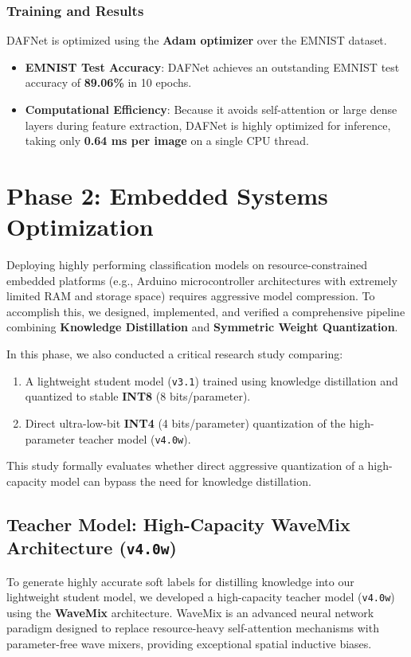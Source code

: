 \documentclass[12pt,a4paper]{article}
\begin{document}
\subsubsection{Training and Results}
DAFNet is optimized using the \textbf{Adam optimizer} over the EMNIST dataset.
\begin{itemize}
    \item \textbf{EMNIST Test Accuracy}: DAFNet achieves an outstanding EMNIST test accuracy of \textbf{89.06\%} in 10 epochs.
    \item \textbf{Computational Efficiency}: Because it avoids self-attention or large dense layers during feature extraction, DAFNet is highly optimized for inference, taking only \textbf{0.64 ms per image} on a single CPU thread.
\end{itemize}

\section{Phase 2: Embedded Systems Optimization}
Deploying highly performing classification models on resource-constrained embedded platforms (e.g., Arduino microcontroller architectures with extremely limited RAM and storage space) requires aggressive model compression. To accomplish this, we designed, implemented, and verified a comprehensive pipeline combining \textbf{Knowledge Distillation} and \textbf{Symmetric Weight Quantization}.

In this phase, we also conducted a critical research study comparing:
\begin{enumerate}
    \item A lightweight student model (\texttt{v3.1}) trained using knowledge distillation and quantized to stable \textbf{INT8} (8 bits/parameter).
    \item Direct ultra-low-bit \textbf{INT4} (4 bits/parameter) quantization of the high-parameter teacher model (\texttt{v4.0w}).
\end{enumerate}

This study formally evaluates whether direct aggressive quantization of a high-capacity model can bypass the need for knowledge distillation.

\subsection{Teacher Model: High-Capacity WaveMix Architecture (\texttt{v4.0w})}
To generate highly accurate soft labels for distilling knowledge into our lightweight student model, we developed a high-capacity teacher model (\texttt{v4.0w}) using the \textbf{WaveMix} architecture. WaveMix is an advanced neural network paradigm designed to replace resource-heavy self-attention mechanisms with parameter-free wave mixers, providing exceptional spatial inductive biases.
\end{document}
